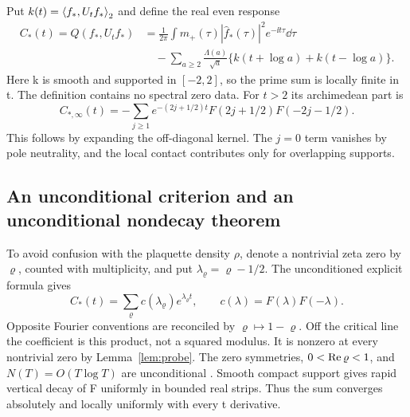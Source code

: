 Put $k(t)=\left\langle f_*,U_tf_*\right\rangle_2$ and define the real even response
\begin{align}\label{eq:C-star}
C_*(t)=Q(f_*,U_tf_*)&=
\frac1{2\pi}\int m_+(\tau)|\widehat f_*(\tau)|^2
                                     e^{-\ii t\tau}\dd\tau\\
&\quad-\sum_{a\ge2}\frac{\Lambda(a)}{\sqrt a}
                  \{k(t+\log a)+k(t-\log a)\}.\nonumber
\end{align}
Here k is smooth and supported in $[-2,2]$, so the prime
sum is locally finite in t. The definition contains no
spectral zero data. For $t>2$ its archimedean part is
\begin{equation}
C_{*,\infty}(t)=
-\sum_{j\ge1}e^{-(2j+1/2)t}
                   F(2j+1/2)F(-2j-1/2).
\end{equation}
This follows by expanding the off-diagonal kernel.
The $j=0$ term vanishes by pole neutrality, and the local
contact contributes only for overlapping supports.

\subsection{An unconditional criterion and an unconditional nondecay theorem}
To avoid confusion with the plaquette density $\rho$, denote
a nontrivial zeta zero by $\varrho$, counted with multiplicity,
and put $\lambda_\varrho=\varrho-1/2$.
The unconditioned explicit formula \cite{cc} gives
\begin{equation}\label{eq:C-zeros}
C_*(t)=\sum_\varrho c(\lambda_\varrho)e^{\lambda_\varrho t},
\qquad c(\lambda)=F(\lambda)F(-\lambda).
\end{equation}
Opposite Fourier conventions are reconciled by
$\varrho\mapsto1-\varrho$. Off the critical line the
coefficient is this product, not a squared modulus.
It is nonzero at every nontrivial zero by Lemma~\ref{lem:probe}.
The zero symmetries, $0<\operatorname{Re}\varrho<1$, and
$N(T)=O(T\log T)$ are unconditional \cite{dlmf,elkies}.
Smooth compact support gives rapid vertical decay of F
uniformly in bounded real strips. Thus the sum converges
absolutely and locally uniformly with every t derivative.


